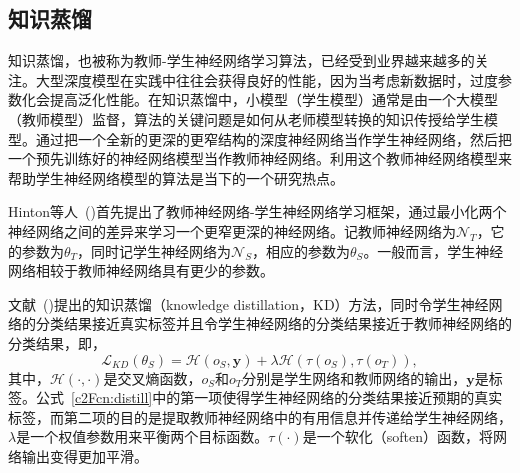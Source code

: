 \subsection{知识蒸馏}
知识蒸馏，也被称为教师-学生神经网络学习算法，已经受到业界越来越多的关注。大型深度模型在实践中往往会获得良好的性能，因为当考虑新数据时，过度参数化会提高泛化性能。在知识蒸馏中，小模型（学生模型）通常是由一个大模型（教师模型）监督，算法的关键问题是如何从老师模型转换的知识传授给学生模型。通过把一个全新的更深的更窄结构的深度神经网络当作学生神经网络，然后把一个预先训练好的神经网络模型当作教师神经网络。利用这个教师神经网络模型来帮助学生神经网络模型的算法是当下的一个研究热点。

Hinton等人~(\cite{Distill})首先提出了教师神经网络-学生神经网络学习框架，通过最小化两个神经网络之间的差异来学习一个更窄更深的神经网络。记教师神经网络为$\mathcal{N}_{T}$，它的参数为$\theta_T$，同时记学生神经网络为$\mathcal{N}_{S}$，相应的参数为$\theta_S$。一般而言，学生神经网络相较于教师神经网络具有更少的参数。


文献~(\cite{Distill})提出的知识蒸馏（knowledge distillation，KD）方法，同时令学生神经网络的分类结果接近真实标签并且令学生神经网络的分类结果接近于教师神经网络的分类结果，即，
\begin{equation}
\mathcal{L}_{KD}(\theta_S) = \mathcal{H}(o_S,\mathbf{y}) +\lambda\mathcal{H}(\tau(o_S),\tau(o_T)),
\label{c2Fcn:distill}
\end{equation}
其中，$\mathcal{H}(\cdot,\cdot)$是交叉熵函数，$o_S$和$o_T$分别是学生网络和教师网络的输出，$\mathbf{y}$是标签。公式~\ref{c2Fcn:distill}中的第一项使得学生神经网络的分类结果接近预期的真实标签，而第二项的目的是提取教师神经网络中的有用信息并传递给学生神经网络，$\lambda$是一个权值参数用来平衡两个目标函数。$\tau(\cdot)$是一个软化（soften）函数，将网络输出变得更加平滑。


